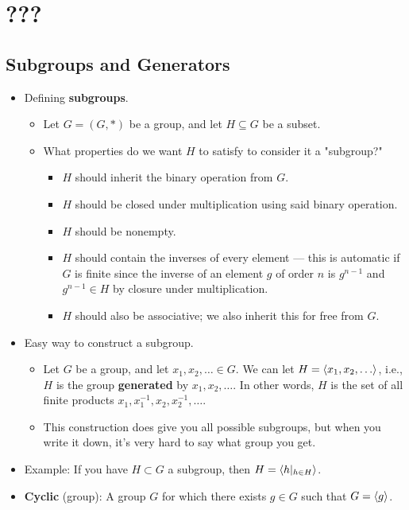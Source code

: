 \documentclass[../notes.tex]{subfiles}
\begin{document}
\chapter{???}
\section{Subgroups and Generators}
\begin{itemize}
    \item {}Defining \textbf{subgroups}.
    \begin{itemize}
        \item Let $G=(G,*)$ be a group, and let $H\subseteq G$ be a subset.
        \item What properties do we want $H$ to satisfy to consider it a "subgroup?"
        \begin{itemize}
            \item $H$ should inherit the binary operation from $G$.
            \item $H$ should be closed under multiplication using said binary operation.
            \item $H$ should be nonempty.
            \item $H$ should contain the inverses of every element --- this is automatic if $G$ is finite since the inverse of an element $g$ of order $n$ is $g^{n-1}$ and $g^{n-1}\in H$ by closure under multiplication.
            \item $H$ should also be associative; we also inherit this for free from $G$.
        \end{itemize}
    \end{itemize}
    \item Easy way to construct a subgroup.
    \begin{itemize}
        \item Let $G$ be a group, and let $x_1,x_2,\dots\in G$. We can let $H=\left\langle{x_1,x_2,\dots}\right\rangle$, i.e., $H$ is the group \textbf{generated} by $x_1,x_2,\dots$. In other words, $H$ is the set of all finite products $x_1,x_1^{-1},x_2,x_2^{-1},\dots$.
        \item This construction does give you all possible subgroups, but when you write it down, it's very hard to say what group you get.
    \end{itemize}
    \item Example: If you have $H\subset G$ a subgroup, then $H=\left\langle{h|_{h\in H}}\right\rangle$.
    \item \textbf{Cyclic} (group): A group $G$ for which there exists $g\in G$ such that $G=\left\langle{g}\right\rangle$.

\end{itemize}
\end{document}
